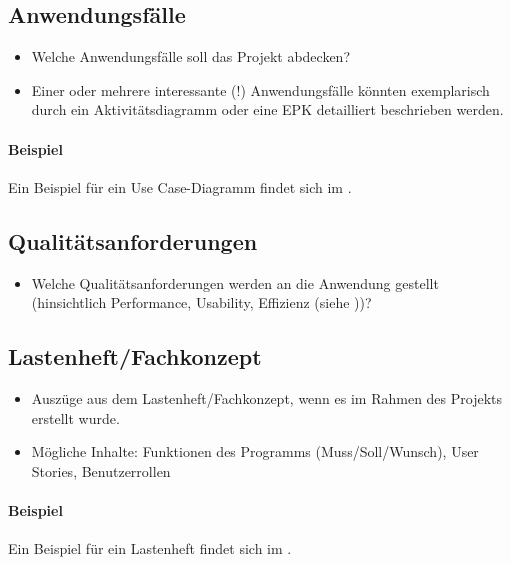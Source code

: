 \subsection{Anwendungsfälle}
\label{sec:Anwendungsfaelle}
\begin{itemize}
	\item Welche Anwendungsfälle soll das Projekt abdecken?
	\item Einer oder mehrere interessante (!) Anwendungsfälle könnten exemplarisch durch ein Aktivitätsdiagramm oder eine \ac{EPK} detailliert beschrieben werden. 
\end{itemize}

\paragraph{Beispiel}
Ein Beispiel für ein Use Case-Diagramm findet sich im .


\subsection{Qualitätsanforderungen}
\label{sec:Qualitaetsanforderungen}
\begin{itemize}
	\item Welche Qualitätsanforderungen werden an die Anwendung gestellt (\zB hinsichtlich Performance, Usability, Effizienz \etc (siehe \citet{ISO9126}))?
\end{itemize}


\subsection{Lastenheft/Fachkonzept}
\label{sec:Lastenheft}
\begin{itemize}
	\item Auszüge aus dem Lastenheft/Fachkonzept, wenn es im Rahmen des Projekts erstellt wurde.
	\item Mögliche Inhalte: Funktionen des Programms (Muss/Soll/Wunsch), User Stories, Benutzerrollen
\end{itemize}

\paragraph{Beispiel}
Ein Beispiel für ein Lastenheft findet sich im . 

